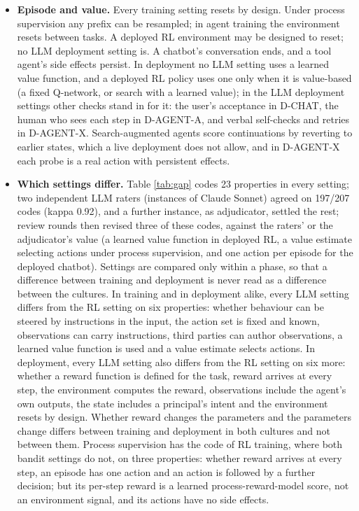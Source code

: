 \documentclass{article}
\begin{document}
\begin{itemize}
\item
  \textbf{Episode and value.} Every training setting resets by design. Under process supervision any prefix can be resampled; in agent training the environment resets between tasks. A deployed RL environment may be designed to reset; no LLM deployment setting is. A chatbot's conversation ends, and a tool agent's side effects persist. In deployment no LLM setting uses a learned value function, and a deployed RL policy uses one only when it is value-based (a fixed Q-network, or search with a learned value); in the LLM deployment settings other checks stand in for it: the user's acceptance in D-CHAT, the human who sees each step in D-AGENT-A, and verbal self-checks and retries in D-AGENT-X. Search-augmented agents score continuations by reverting to earlier states, which a live deployment does not allow, and in D-AGENT-X each probe is a real action with persistent effects.
\item
  \textbf{Which settings differ.} Table \ref{tab:gap} codes 23 properties in every setting; two independent LLM raters (instances of Claude Sonnet) agreed on 197/207 codes (kappa 0.92), and a further instance, as adjudicator, settled the rest; review rounds then revised three of these codes, against the raters' or the adjudicator's value (a learned value function in deployed RL, a value estimate selecting actions under process supervision, and one action per episode for the deployed chatbot). Settings are compared only within a phase, so that a difference between training and deployment is never read as a difference between the cultures. In training and in deployment alike, every LLM setting differs from the RL setting on six properties: whether behaviour can be steered by instructions in the input, the action set is fixed and known, observations can carry instructions, third parties can author observations, a learned value function is used and a value estimate selects actions. In deployment, every LLM setting also differs from the RL setting on six more: whether a reward function is defined for the task, reward arrives at every step, the environment computes the reward, observations include the agent's own outputs, the state includes a principal's intent and the environment resets by design. Whether reward changes the parameters and the parameters change differs between training and deployment in both cultures and not between them. Process supervision has the code of RL training, where both bandit settings do not, on three properties: whether reward arrives at every step, an episode has one action and an action is followed by a further decision; but its per-step reward is a learned process-reward-model score, not an environment signal, and its actions have no side effects.
\end{itemize}
\end{document}
